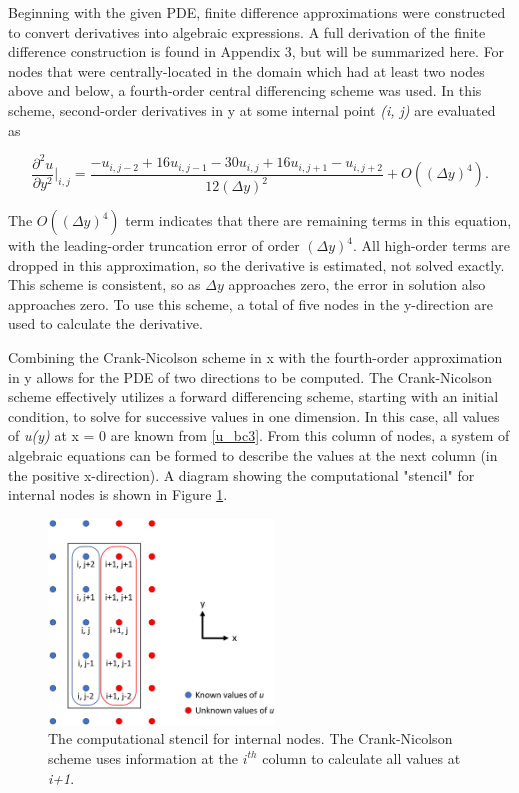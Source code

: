 \documentclass[10pt]{article}
\begin{document}
Beginning with the given PDE, finite difference approximations were constructed to convert derivatives into algebraic expressions. A full derivation of the finite difference construction is found in Appendix 3, but will be summarized here. For nodes that were centrally-located in the domain which had at least two nodes above and below, a fourth-order central differencing scheme was used. In this scheme, second-order derivatives in y at some internal point \textit{(i, j)} are evaluated as

\vspace{-5pt}
\begin{equation}
\frac{\partial^2 u}{\partial y^2} \bigg\rvert_{i,j} = \frac{-u_{i,j-2} + 16u_{i,j-1} - 30u_{i,j} + 16u_{i,j+1} - u_{i,j+2}}{12 (\Delta y)^2} + O((\Delta y)^4).
\end{equation}

The $O((\Delta y)^4)$ term indicates that there are remaining terms in this equation, with the leading-order truncation error of order $(\Delta y)^4$. All high-order terms are dropped in this approximation, so the derivative is estimated, not solved exactly. This scheme is consistent, so as $\Delta y$ approaches zero, the error in solution also approaches zero. To use this scheme, a total of five nodes in the y-direction are used to calculate the derivative. \bigskip

Combining the Crank-Nicolson scheme in x with the fourth-order approximation in y allows for the PDE of two directions to be computed. The Crank-Nicolson scheme effectively utilizes a forward differencing scheme, starting with an initial condition, to solve for successive values in one dimension. In this case, all values of \textit{u(y)} at x = 0 are known from \eqref{u_bc3}. From this column of nodes, a system of algebraic equations can be formed to describe the values at the next column (in the positive x-direction). A diagram showing the computational "stencil" for internal nodes is shown in Figure \ref{stencil}. 

\begin{figure}[H]
	\begin{center}
		\includegraphics[width=6cm]{stencil.PNG}
  		\caption{The computational stencil for internal nodes. The Crank-Nicolson scheme uses information at the \textit{$i^{th}$} column to calculate all values at \textit{i+1}.}
  		\label{stencil}
	\end{center}
\end{figure}
\end{document}
